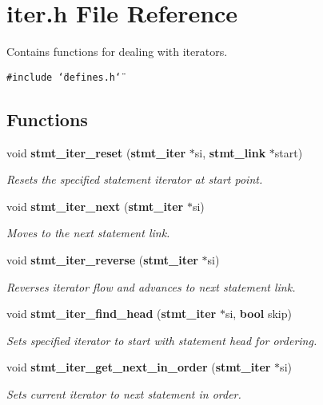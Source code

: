 \section{iter.h File Reference}
\label{iter_8h}
Contains functions for dealing with iterators. 


{\tt \#include \char`\"{}defines.h\char`\"{}}\par
\subsection*{Functions}
\begin{CompactItemize}
\item 
void {\bf stmt\_\-iter\_\-reset} ({\bf stmt\_\-iter} $\ast$si, {\bf stmt\_\-link} $\ast$start)
\begin{CompactList}\small\item\em Resets the specified statement iterator at start point.\item\end{CompactList}\item 
void {\bf stmt\_\-iter\_\-next} ({\bf stmt\_\-iter} $\ast$si)
\begin{CompactList}\small\item\em Moves to the next statement link.\item\end{CompactList}\item 
void {\bf stmt\_\-iter\_\-reverse} ({\bf stmt\_\-iter} $\ast$si)
\begin{CompactList}\small\item\em Reverses iterator flow and advances to next statement link.\item\end{CompactList}\item 
void {\bf stmt\_\-iter\_\-find\_\-head} ({\bf stmt\_\-iter} $\ast$si, {\bf bool} skip)
\begin{CompactList}\small\item\em Sets specified iterator to start with statement head for ordering.\item\end{CompactList}\item 
void {\bf stmt\_\-iter\_\-get\_\-next\_\-in\_\-order} ({\bf stmt\_\-iter} $\ast$si)
\begin{CompactList}\small\item\em Sets current iterator to next statement in order.\item\end{CompactList}\end{CompactItemize}



